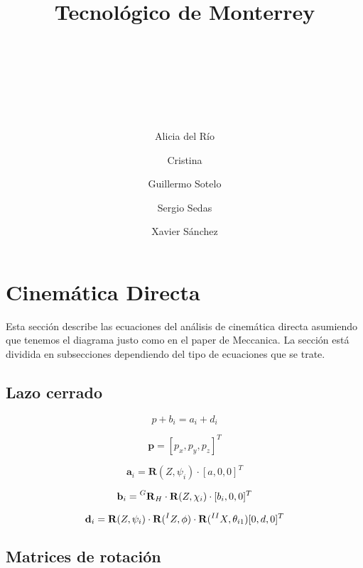 \documentclass[titlepage, letterpaper, fleqn]{article}
\title{
\vspace{1in}
\textbf{Tecnológico de Monterrey} \\
\vspace{0.5in}
\textmd{\mahclass} \\
\large{\textit{\mahteacher}} \\
\vspace{0.5in}
\textsc{\mahtitle}\\
\author{Alicia del Río \and Cristina \and Guillermo Sotelo \and Sergio Sedas \and Xavier Sánchez}
\date{\mahdate}
}
\let\bs\mathbf
\begin{document}
\begin{titlepage}
\maketitle
\end{titlepage}

%
%

\section{Cinemática Directa} %
\label{sec:forward}

Esta sección describe las ecuaciones del análisis de cinemática directa asumiendo que tenemos el diagrama justo como en el paper de Meccanica.
La sección está dividida en subsecciones dependiendo del tipo de ecuaciones que se trate.

\subsection{Lazo cerrado} %
\label{sec:loop-closure}


\begin{equation}
    \label{eq:loop-closure}
    p+b_i = a_i + d_i
\end{equation}

\begin{equation}
    \label{eq:p-vector}
    \bs{p} = [p_x,p_y,p_z]^T
\end{equation}

\begin{equation}
    \label{eq:a-vector}
    \bs{a}_i = \bs{R}(Z,\psi_i) \cdot [a,0,0]^T
\end{equation}

\begin{equation}
    \label{eq:b-vector}
    \bs{b}_i = \prescript{G}{}{\bs{R}}_H \cdot \bs{R}(Z,\chi_i) \cdot [b_i, 0, 0]^T
\end{equation}

\begin{equation}
    \label{eq:d-vector}
    \bs{d}_i = \bs{R}(Z,\psi_i) \cdot \bs{R}(\prescript{I}{}{Z},\phi) \cdot \bs{R}(\prescript{II}{}{X}, \theta_{i1})[0,d,0]^T
\end{equation}

\subsection{Matrices de rotación} %
\label{sec:rotations}
\end{document}

